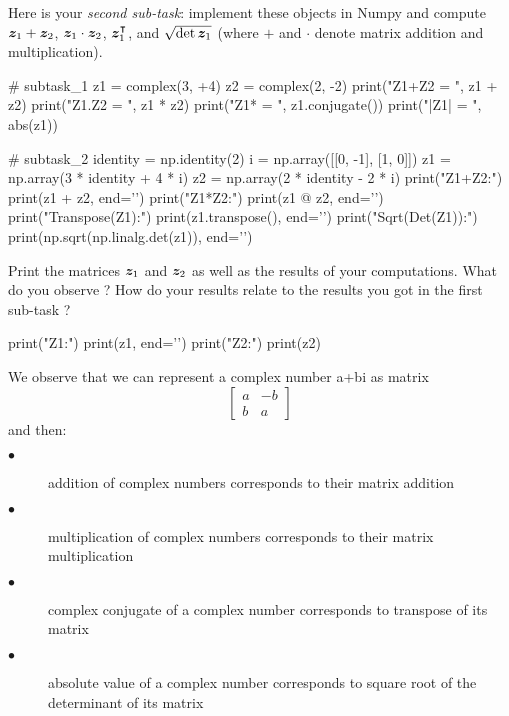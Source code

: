 Here is your \emph{second sub-task}: implement these objects in Numpy and compute $\bm{z}_1 + \bm{z}_2$, $\bm{z}_1 \cdot \bm{z}_2$, $\bm{z}_1^\intercal$, and $\sqrt{\det{\bm{z}_1}}$ (where $+$ and $\cdot$ denote matrix addition and multiplication).
\begin{python}
# subtask_1
z1 = complex(3, +4)
z2 = complex(2, -2)
print("Z1+Z2 = ", z1 + z2)
print("Z1.Z2 = ", z1 * z2)
print("Z1* = ", z1.conjugate())
print("|Z1| = ", abs(z1))

# subtask_2
identity = np.identity(2)
i = np.array([[0, -1], [1, 0]])
z1 = np.array(3 * identity + 4 * i)
z2 = np.array(2 * identity - 2 * i)
print("Z1+Z2:")
print(z1 + z2, end='\n\n')
print("Z1*Z2:")
print(z1 @ z2, end='\n\n')
print("Transpose(Z1):")
print(z1.transpose(), end='\n\n')
print("Sqrt(Det(Z1)):")
print(np.sqrt(np.linalg.det(z1)), end='\n\n')

\end{python}
\vspace{2cm}

Print the matrices $\bm{z}_1$ and $\bm{z}_2$ as well as the results of your computations. What do you observe ? How do your results relate to the results you got in the first sub-task ?
\color{blue} \\[1ex]

\begin{python}
print("Z1:")
print(z1, end='\n\n')
print("Z2:")
print(z2)
\end{python}

We observe that we can represent a complex number a+bi as matrix $$\begin{bmatrix} a & -b \\ b & a \end{bmatrix}$$ and then:
\begin{description}
  \item[$\bullet$] addition of complex numbers corresponds to their matrix addition
  \item[$\bullet$] multiplication of complex numbers corresponds to their matrix multiplication
  \item[$\bullet$] complex conjugate of a complex number corresponds to transpose of its matrix
  \item[$\bullet$] absolute value of a complex number corresponds to square root of the determinant of its matrix
\end{description}

